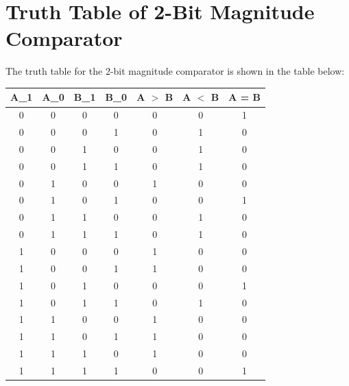 \documentclass[journal,12pt,twocolumn]{IEEEtran}
\numberwithin{equation}{section}
\begin{document}
\section{Truth Table of 2-Bit Magnitude Comparator}
The truth table for the 2-bit magnitude comparator is shown in the table below: 

\medskip

    \centering
          \begin{tabular}{|c|c|c|c|c|c|c|}
            \hline
            A_1 & A_0 & B_1 & B_0 & A $>$ B & A $<$ B & A = B\\
            \hline
            0 & 0 & 0 & 0 & 0 & 0 &  1\\
            \hline
            0 & 0 & 0 & 1 & 0 & 1 & 0\\
            \hline
            0 & 0 & 1 & 0 & 0 & 1 & 0\\
            \hline
            0 & 0 & 1 & 1 & 0 & 1 & 0\\
            \hline
             0 & 1 & 0 & 0 & 1 & 0 & 0\\
            \hline
             0 & 1 & 0 & 1 &  0 & 0 & 1\\
            \hline
            0 & 1 & 1 & 0 & 0 & 1 & 0\\
            \hline
            0 & 1 & 1 & 1 & 0 & 1 & 0\\
            \hline
            1 & 0 & 0 & 0 & 1 & 0 & 0\\
            \hline
            1 & 0 & 0 & 1 & 1 & 0 & 0\\
            \hline
            1 & 0 & 1 & 0 & 0 & 0 &  1\\
            \hline
            1 & 0 & 1 & 1 & 0 & 1 &  0\\
            \hline
            1 & 1 & 0 & 0 & 1 & 0 &  0\\
            \hline
            1 & 1 & 0 & 1 & 1 & 0 &  0\\
            \hline
             1 & 1 & 1 & 0 & 1 & 0 &  0\\
            \hline
           1 & 1 & 1 & 1 & 0 & 0 &  1\\
            
            \hline
            
        \end{tabular}
     

\end{document}

